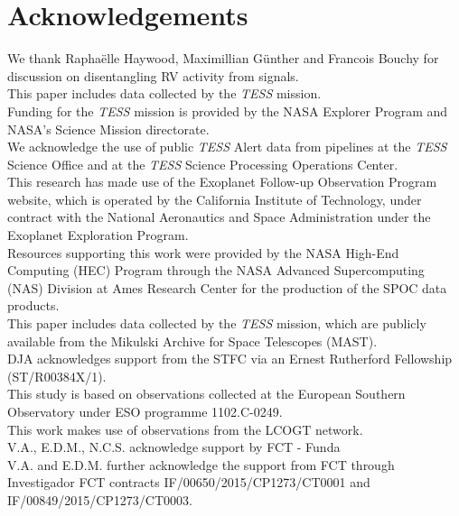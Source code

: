 \documentclass[fleqn,usenatbib]{mnras}
\newcommand{\tess}{{\it TESS}}
\begin{document}

\section*{Acknowledgements}
We thank Rapha{\"e}lle Haywood, Maximillian G{\"u}nther and Francois Bouchy for discussion on disentangling RV activity from signals.\\
This paper includes data collected by the \tess{} mission.\\
Funding for the \tess{} mission is provided by the NASA Explorer Program and NASA's Science Mission directorate. \\
We acknowledge the use of public \tess{} Alert data from pipelines at the \tess{} Science Office and at the \tess{} Science Processing Operations Center. \\
This research has made use of the Exoplanet Follow-up Observation Program website, which is operated by the California Institute of Technology, under contract with the National Aeronautics and Space Administration under the Exoplanet Exploration Program. \\
Resources supporting this work were provided by the NASA High-End Computing (HEC) Program through the NASA Advanced Supercomputing (NAS) Division at Ames Research Center for the production of the SPOC data products. \\
This paper includes data collected by the \tess{} mission, which are publicly available from the Mikulski Archive for Space Telescopes (MAST).\\
DJA acknowledges support from the STFC via an Ernest Rutherford Fellowship (ST/R00384X/1).\\ %
This study is based on observations collected at the European Southern Observatory under ESO programme 1102.C-0249.\\ %
This work makes use of observations from the LCOGT network.\\ %
V.A., E.D.M., N.C.S. acknowledge support by FCT - Funda\\ %
V.A. and E.D.M. further acknowledge the support from FCT through Investigador FCT contracts IF/00650/2015/CP1273/CT0001 and IF/00849/2015/CP1273/CT0003.\\ %
\end{document}
